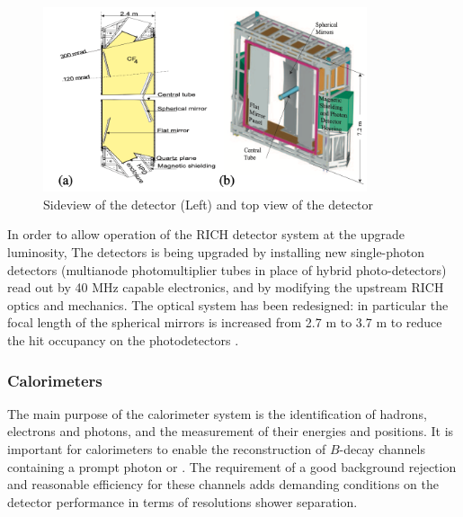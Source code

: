\begin{figure}[!hbtp]
\centering
\includegraphics[width=0.85\textwidth]{Figures/02_Detector/RICH}%
   \caption{ Sideview of the \richone detector (Left) and top view of the \richtwo detector\supercite{LHCb-DP-2008-001}}
\label{fig:RICH}
\end{figure}

In order to allow operation of the RICH detector system at the upgrade luminosity,
The \rich detectors is being upgraded by installing new single-photon detectors 
(multianode photomultiplier tubes in place of hybrid photo-detectors) read out by 40 MHz capable electronics, 
and by modifying the upstream RICH optics and mechanics.
The \richone optical system has been redesigned: 
in particular the focal length of the spherical mirrors is increased from 2.7 m to 3.7 m to reduce the hit occupancy on the photodetectors
\supercite{LHCb-TDR-015,FIORINI2020161688}. 



\subsubsection{Calorimeters}
\label{subsubsec:calorimter}

The main purpose of the calorimeter system is the identification of hadrons, electrons and photons,
and the measurement of their energies and positions.
It is important for calorimeters to enable the reconstruction of $B$-decay channels containing a prompt photon or \piz.
The requirement of a good background rejection and reasonable efficiency for these channels 
adds demanding conditions on the detector performance in terms of resolutions shower separation.

